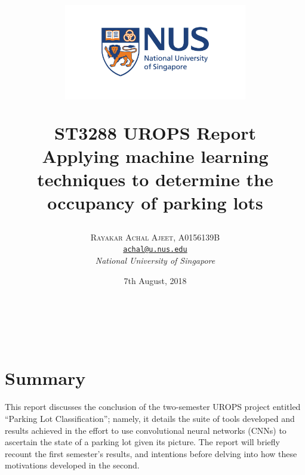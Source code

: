 \documentclass[a4paper, 11pt]{article} %
\title{
	\begin{figure}
		\begin{center}
					\includegraphics[width=8cm]{figures/logo.jpg}
		\end{center}
	\end{figure}	
	\textbf{ST3288 UROPS Report
}\\
Applying machine learning techniques to determine the occupancy of parking lots}
\author{\textsc{Rayakar Achal Ajeet, A0156139B}\\
		\texttt{\hyperlink{achal@u.nus.edu}{achal@u.nus.edu}}\\
		\textit{National University of Singapore}
}
\date{7th August, 2018}
\makeatletter
\renewcommand{\maketitle}{
\begin{flushright}
	{\LARGE\@title}
	\vspace{50pt} \\
	{\large\@author}
	\\\@date
	\vspace{40pt}
\end{flushright}
}
\makeatother
\begin{document}
\maketitle %

\newpage

\tableofcontents

\newpage

\section{Summary}
    This report discusses the conclusion of the two-semester UROPS project entitled ``Parking Lot
    Classification''; namely, it details the suite of tools developed and results achieved in the effort to use
    convolutional neural networks (CNNs) to ascertain the state of a parking lot given its picture. The 
    report will briefly recount the first semester's results, and intentions before delving into how these 
    motivations developed in the second.
\newpage
\end{document}

